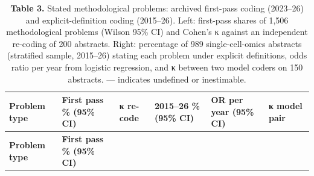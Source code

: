 \documentclass[11pt]{article}
\newenvironment{tablefont}{\par\scriptsize\setlength{\tabcolsep}{3.5pt}}{\par}
\newcommand{\thead}[1]{\textbf{#1}}
\begin{document}
\begin{tablefont}

\begin{longtable}[l]{@{}
  >{\raggedright\arraybackslash}p{}
  >{\raggedright\arraybackslash}p{}
  >{\raggedright\arraybackslash}p{}
  >{\raggedright\arraybackslash}p{}
  >{\raggedright\arraybackslash}p{}
  >{\raggedright\arraybackslash}p{}@{}}
\caption{\textbf{Table 3.} Stated methodological problems: archived first-pass
coding (2023--26) and explicit-definition coding (2015--26). Left:
first-pass shares of 1,506 methodological problems (Wilson 95\% CI) and
Cohen's κ against an independent re-coding of 200 abstracts. Right:
percentage of 989 single-cell-omics abstracts (stratified sample,
2015--26) stating each problem under explicit definitions, odds ratio
per year from logistic regression, and κ between two model coders on 150
abstracts. --- indicates undefined or inestimable.}\tabularnewline
\toprule
\begin{minipage}[b]{\linewidth}\raggedright
\thead{Problem type}
\end{minipage} & \begin{minipage}[b]{\linewidth}\raggedright
\thead{First pass \% (95\% CI)}
\end{minipage} & \begin{minipage}[b]{\linewidth}\raggedright
\thead{κ re-code}
\end{minipage} & \begin{minipage}[b]{\linewidth}\raggedright
\thead{2015--26 \% (95\% CI)}
\end{minipage} & \begin{minipage}[b]{\linewidth}\raggedright
\thead{OR per year (95\% CI)}
\end{minipage} & \begin{minipage}[b]{\linewidth}\raggedright
\thead{κ model pair}
\end{minipage} \\
\midrule
\endfirsthead
\toprule
\begin{minipage}[b]{\linewidth}\raggedright
\thead{Problem type}
\end{minipage} & \begin{minipage}[b]{\linewidth}\raggedright
\thead{First pass \% (95\% CI)}
\end{minipage} & \begin{minipage}[b]{\linewidth}\raggedright

\end{minipage}
\end{longtable}
\end{tablefont}
\end{document}
